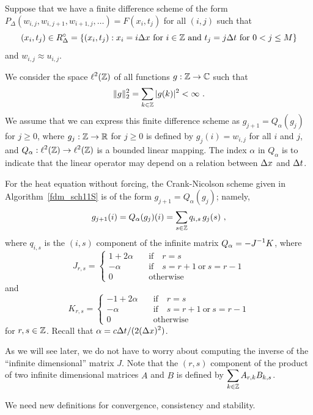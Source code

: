 Suppose that we have a finite difference scheme of the form
$P_\Delta(w_{i,j},w_{i,j+1},w_{i+1,j}, \ldots) = F(x_i,t_j)$ for all
$(i,j)$ such that
\[
(x_i,t_j) \in R^\circ_\Delta = \left\{ (x_i,t_j) : x_i = i \Delta{x} \ \text{for} \
i \in \mathbb{Z} \ \text{and} \ t_j = j \Delta{t} \ \text{for} \ 0 < j \leq M \right\}
\]
and $w_{i,j} \approx u_{i,j}$.

We consider the space $\displaystyle \ell^2(\mathbb{Z})$ of all functions
$g:\mathbb{Z} \to \mathbb{C}$ such that
\[
  \|g\|_2^2 = \sum_{k\in \mathbb{Z}} |g(k)|^2 < \infty \ .
\]
We assume that we can express this finite difference scheme as
$g_{j+1} = Q_\alpha(g_j)$ for $j \geq 0$, where
$g_j:\mathbb{Z} \to \mathbb{R}$ for $j\geq 0$ is defined by
$g_j(i) = w_{i,j}$ for all $i$ and $j$, and
$\displaystyle Q_\alpha:\ell^2(\mathbb{Z}) \to \ell^2(\mathbb{Z})$ is
a bounded linear mapping.  The index $\alpha$ in
$Q_\alpha$ is to indicate that the linear operator may depend on a
relation between $\Delta{x}$ and $\Delta{t}$.

\begin{egg}
For the heat equation without forcing, the Crank-Nicolson
scheme given in Algorithm~\ref{fdm_sch11S} is of the form
$g_{j+1} = Q_\alpha(g_j)$; namely,
\[
  g_{j+1}(i) = Q_\alpha(g_j)(i) = \sum_{s\in \mathbb{Z}} q_{i,s}\, g_j(s) \ ,
\]
where $q_{i,s}$ is the $(i,s)$ component of the infinite matrix
$\displaystyle Q_\alpha = -J^{-1} K$, where
\[
J_{r,s} =
\begin{cases}
1 + 2 \alpha & \quad \text{if} \quad r = s \\
-\alpha & \quad \text{if} \quad s = r + 1 \ \text{or} \ s = r - 1\\
0 & \quad \text{otherwise}
\end{cases}
\]
and
\[
K_{r,s} =
\begin{cases}
-1 + 2 \alpha & \quad \text{if} \quad r = s \\
-\alpha & \quad \text{if} \quad s=r+1 \ \text{or} \ s = r - 1\\
0 & \quad \text{otherwise}
\end{cases}
\]
for $r,s \in \mathbb{Z}$.  Recall that
$\displaystyle \alpha = c \Delta{t} / (2 (\Delta{x})^2)$.

As we will see later, we do not have to worry
about computing the inverse of the ``infinite dimensional'' matrix
$J$.  Note that the $(r,s)$ component of the product of two infinite
dimensional matrices $A$ and $B$ is defined by
$\displaystyle \sum_{k\in \mathbb{Z}} A_{r,k}B_{k,s}$.
\label{ell2CNegg1}
\end{egg}

We need new definitions for convergence, consistency and stability.

